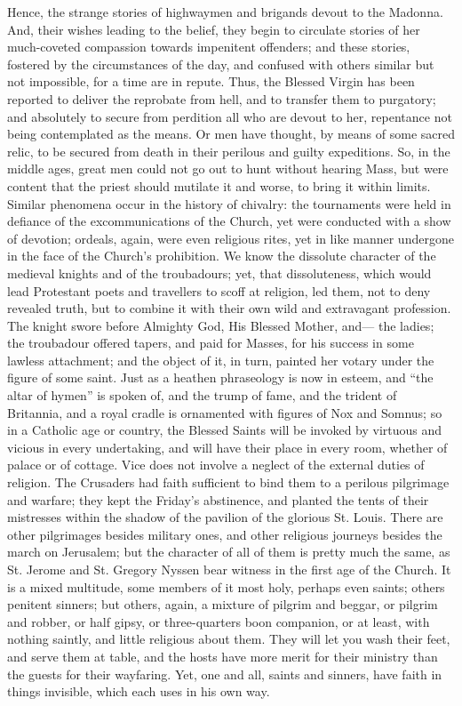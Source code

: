 Hence, the strange stories of highwaymen and brigands devout to the
Madonna. And, their wishes leading to the belief, they begin to
circulate stories of her much-coveted compassion towards impenitent
offenders; and these stories, fostered by the circumstances of the
day, and confused with others similar but not impossible, for a time
are in repute. Thus, the Blessed Virgin has been reported to deliver
the reprobate from hell, and to transfer them to purgatory; and
absolutely to secure from perdition all who are devout to her,
repentance not being contemplated as the means. Or men have thought,
by means of some sacred relic, to be secured from death in their
perilous and guilty expeditions. So, in the middle ages, great men
could not go out to hunt without hearing Mass, but were content that
the priest should mutilate it and worse, to bring it within limits.
Similar phenomena occur in the history of chivalry: the tournaments
were held in defiance of the excommunications of the Church, yet were
conducted with a show of devotion; ordeals, again, were even religious
rites, yet in like manner undergone in the face of the Church's
prohibition. We know the dissolute character of the medieval knights
and of the troubadours; yet, that dissoluteness, which would lead
Protestant poets and travellers to scoff at religion, led them, not to
deny revealed truth, but to combine it with their own wild and
extravagant profession. The knight swore before Almighty God, His
Blessed Mother, and— the ladies; the troubadour offered tapers, and
paid for Masses, for his success in some lawless attachment; and the
object of it, in turn, painted her votary under the figure of some
saint. Just as a heathen phraseology is now in esteem, and ``the
altar of hymen'' is spoken of, and the trump of fame, and the
trident of Britannia, and a royal cradle is ornamented with figures of
Nox and Somnus; so in a Catholic age or country, the Blessed Saints
will be invoked by virtuous and vicious in every undertaking, and will
have their place in every room, whether of palace or of cottage. Vice
does not involve a neglect of the external duties of religion. The
Crusaders had faith sufficient to bind them to a perilous pilgrimage
and warfare; they kept the Friday's abstinence, and planted the tents
of their mistresses within the shadow of the pavilion of the glorious
St. Louis. There are other pilgrimages besides military ones, and
other religious journeys besides the march on Jerusalem; but the
character of all of them is pretty much the same, as St. Jerome and
St. Gregory Nyssen bear witness in the first age of the Church. It is
a mixed multitude, some members of it most holy, perhaps even saints;
others penitent sinners; but others, again, a mixture of pilgrim and
beggar, or pilgrim and robber, or half gipsy, or three-quarters boon
companion, or at least, with nothing saintly, and little religious
about them. They will let you wash their feet, and serve them at
table, and the hosts have more merit for their ministry than the
guests for their wayfaring. Yet, one and all, saints and sinners, have
faith in things invisible, which each uses in his own way.

